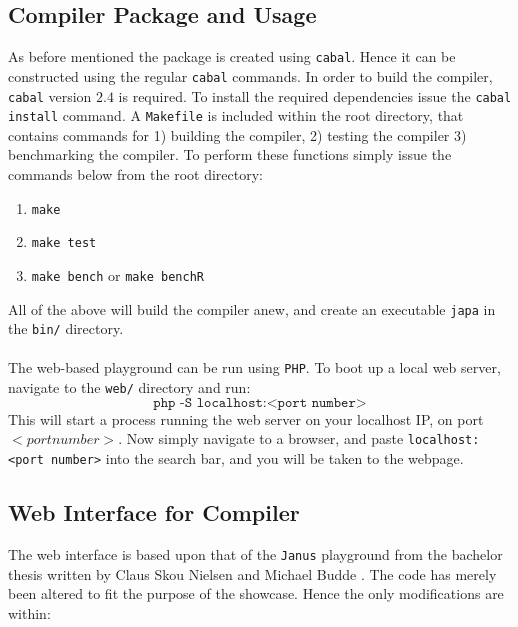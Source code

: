 \subsection{Compiler Package and Usage \rr}
As before mentioned the \lan package is created using \texttt{cabal}. Hence it can be constructed
using the regular \texttt{cabal} commands.
In order to build the compiler, \texttt{cabal} version $2.4$ is required. To install the
required dependencies issue the \texttt{cabal install} command.
A \texttt{Makefile} is included within
the root directory, that contains commands for 1) building the compiler, 2) testing the compiler
3) benchmarking the compiler. To perform these functions simply issue the commands below from
the root directory:
\begin{enumerate}
    \item \texttt{make}
    \item \texttt{make test}
    \item \texttt{make bench} or \texttt{make benchR}
\end{enumerate}
\noindent
All of the above will build the compiler anew, and create an executable \texttt{japa} in the
\texttt{bin/} directory.
\\
\\
The web-based \lan playground can be run using \texttt{PHP}. To boot up a local web server,
navigate to the \texttt{web/} directory and run:
$$\texttt{php -S localhost:<port number>}$$
\noindent
This will start a process running the web server on your localhost IP, on port $<port number>$.
Now simply navigate to a browser, and paste \texttt{localhost:<port number>} into the search bar,
and you will be taken to the webpage.

\subsection{Web Interface for Compiler \rr}
The web interface is based upon that of the \texttt{Janus} playground \cite{janusInterp} from
the bachelor thesis written by Claus Skou Nielsen and Michael Budde \cite{janusPlayground}.
The code has merely been altered to fit the purpose of the \lan showcase. Hence the only
modifications are within:


